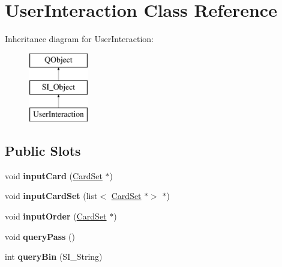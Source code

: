 \hypertarget{class_user_interaction}{}\section{User\+Interaction Class Reference}
\label{class_user_interaction}
Inheritance diagram for User\+Interaction\+:\begin{figure}[H]
\begin{center}
\leavevmode
\includegraphics[height=3.000000cm]{class_user_interaction}
\end{center}
\end{figure}
\subsection*{Public Slots}
\begin{DoxyCompactItemize}
\item 
\mbox{\label{class_user_interaction_a19c4330dde326f5593946abf8f7cd213}} 
void {\bfseries input\+Card} (\hyperlink{class_card_set}{Card\+Set} $\ast$)
\item 
\mbox{\label{class_user_interaction_a65714650c645b9c1865500702b553b7e}} 
void {\bfseries input\+Card\+Set} (list$<$ \hyperlink{class_card_set}{Card\+Set} $\ast$$>$ $\ast$)
\item 
\mbox{\label{class_user_interaction_a3d7c9ea75ca204150e2d2a3aacdda72a}} 
void {\bfseries input\+Order} (\hyperlink{class_card_set}{Card\+Set} $\ast$)
\item 
\mbox{\label{class_user_interaction_ab7bce422790b17da78f8cdb45b928013}} 
void {\bfseries query\+Pass} ()
\item 
\mbox{\label{class_user_interaction_a5c4d87eabeb266804c9241b65c198ccc}} 
int {\bfseries query\+Bin} (S\+I\+\_\+\+String)
\end{DoxyCompactItemize}
